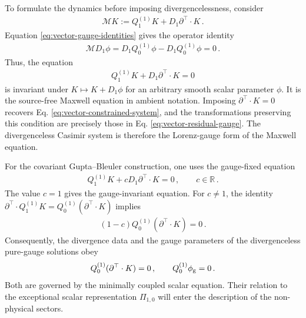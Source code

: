\documentclass{SciPost}
\begin{document}
To formulate the dynamics before imposing divergencelessness, consider
\begin{align}
    \mathcal M K
    :=Q^{(1)}_1K+D_1\partial^{\top}\cdot K \,.
\end{align}
Equation \eqref{eq:vector-gauge-identities} gives the operator identity
\begin{align}
    \mathcal M D_1\phi
    =D_1Q^{(1)}_0\phi-D_1Q^{(1)}_0\phi
    =0 \,.
\end{align}
Thus, the equation
\begin{align}\label{eq:vector-gauge-invariant}
    Q^{(1)}_1K+D_1\partial^{\top}\cdot K=0
\end{align}
is invariant under $K\mapsto K+D_1\phi$ for an arbitrary smooth scalar parameter $\phi$. It is the source-free Maxwell equation in ambient notation. Imposing $\partial^{\top}\cdot K=0$ recovers Eq. \eqref{eq:vector-constrained-system}, and the transformations preserving this condition are precisely those in Eq. \eqref{eq:vector-residual-gauge}. The divergenceless Casimir system is therefore the Lorenz-gauge form of the Maxwell equation.

For the covariant Gupta--Bleuler construction, one uses the gauge-fixed equation
\begin{align}\label{eq:vector-gauge-fixed}
    Q^{(1)}_1K+cD_1\partial^{\top}\cdot K=0 \,,
    \qquad c\in\mathbb R \,.
\end{align}
The value $c=1$ gives the gauge-invariant equation. For $c\neq1$, the identity $\partial^{\top}\cdot Q^{(1)}_1K =Q^{(1)}_0(\partial^{\top}\cdot K)$ implies
\begin{align}
    (1-c)Q^{(1)}_0(\partial^{\top}\cdot K)=0 \,.
\end{align}
Consequently, the divergence data and the gauge parameters of the divergenceless pure-gauge solutions obey
\begin{align}\label{eq:vector-scalar-sectors}
    Q^{(1)}_0(\partial^{\top}\cdot K)=0 \,,
    \qquad
    Q^{(1)}_0\phi_{\rm g}=0 \,.
\end{align}
Both are governed by the minimally coupled scalar equation. Their relation to the exceptional scalar representation $\Pi_{1,0}$ will enter the description of the non-physical sectors.
\end{document}
